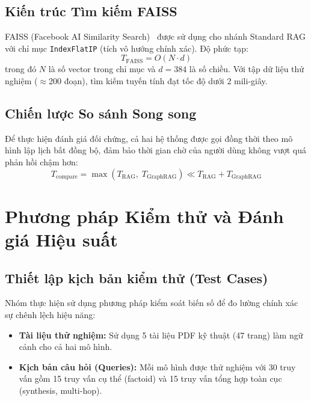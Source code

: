 \documentclass[10pt, conference, a4paper]{IEEEtran}
\begin{document}
\subsection{Kiến trúc Tìm kiếm FAISS}

FAISS (Facebook AI Similarity Search)~\cite{johnson2021faiss} được sử
dụng cho nhánh Standard RAG với chỉ mục \texttt{IndexFlatIP} (tích vô
hướng chính xác). Độ phức tạp:
\begin{equation}
  T_{\text{FAISS}} = O(N \cdot d)
  \label{eq:faiss}
\end{equation}
trong đó $N$ là số vector trong chỉ mục và $d = 384$ là số chiều. Với
tập dữ liệu thử nghiệm ($\approx$200 đoạn), tìm kiếm tuyến tính đạt
tốc độ dưới 2 mili-giây.

\subsection{Chiến lược So sánh Song song}

Để thực hiện đánh giá đối chứng, cả hai hệ thống được gọi đồng thời
theo mô hình lập lịch bất đồng bộ, đảm bảo thời gian chờ của người
dùng không vượt quá phản hồi chậm hơn:
\begin{equation}
  T_{\text{compare}} = \max(T_{\text{RAG}},\; T_{\text{GraphRAG}})
    \ll T_{\text{RAG}} + T_{\text{GraphRAG}}
  \label{eq:parallel}
\end{equation}

\section{Phương pháp Kiểm thử và Đánh giá Hiệu suất}

\subsection{Thiết lập kịch bản kiểm thử (Test Cases)}

Nhóm thực hiện sử dụng phương pháp kiểm soát biến số để đo lường
chính xác sự chênh lệch hiệu năng:

\begin{itemize}
  \item \textbf{Tài liệu thử nghiệm:} Sử dụng 5 tài liệu PDF kỹ thuật
    (47 trang) làm ngữ cảnh cho cả hai mô hình.
  \item \textbf{Kịch bản câu hỏi (Queries):} Mỗi mô hình được thử
    nghiệm với 30 truy vấn gồm 15 truy vấn cụ thể (factoid) và 15
    truy vấn tổng hợp toàn cục (synthesis, multi-hop).
\end{itemize}
\end{document}
